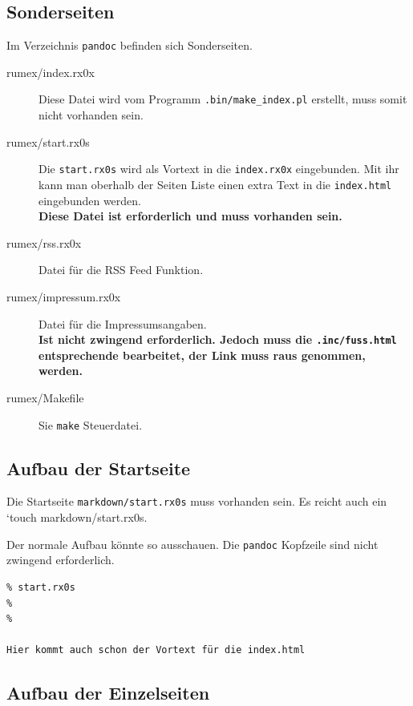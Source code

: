 \documentclass[%
fontsize=12pt,%
parskip=half,%
version=last%
]{scrreprt}
\begin{document}
\subsection{Sonderseiten}\label{sonderseiten}

Im Verzeichnis \texttt{pandoc} befinden sich Sonderseiten.

\begin{description}
\item[rumex/index.rx0x]
Diese Datei wird vom Programm \texttt{.bin/make\_index.pl} erstellt,
muss somit nicht vorhanden sein.
\item[rumex/start.rx0s]
Die \texttt{start.rx0s} wird als Vortext in die \texttt{index.rx0x}
eingebunden. Mit ihr kann man oberhalb der Seiten Liste einen extra Text
in die \texttt{index.html} eingebunden werden.\\\textbf{Diese Datei ist
erforderlich und muss vorhanden sein.}
\item[rumex/rss.rx0x]
Datei für die RSS Feed Funktion.
\item[rumex/impressum.rx0x]
Datei für die Impressumsangaben.\\\textbf{Ist nicht zwingend
erforderlich. Jedoch muss die \texttt{.inc/fuss.html} entsprechende
bearbeitet, der Link muss raus genommen, werden.}
\item[rumex/Makefile]
Sie \texttt{make} Steuerdatei.
\end{description}

\subsection{Aufbau der Startseite}\label{aufbau-der-startseite}

Die Startseite \texttt{markdown/start.rx0s} muss vorhanden sein. Es
reicht auch ein `touch markdown/start.rx0s.

Der normale Aufbau könnte so ausschauen. Die \texttt{pandoc} Kopfzeile
sind nicht zwingend erforderlich.

\begin{verbatim}
% start.rx0s
%
%

Hier kommt auch schon der Vortext für die index.html
\end{verbatim}

\subsection{Aufbau der Einzelseiten}\label{aufbau-der-einzelseiten}
\end{document}
